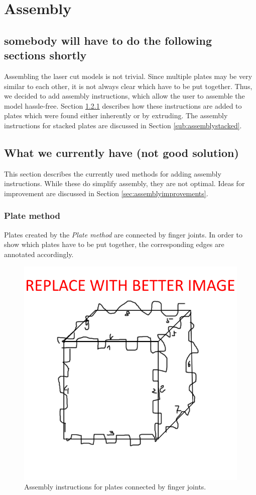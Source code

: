 \documentclass[../ClassicThesis.tex]{subfiles}
\begin{document}
\chapter{Assembly}\label{ch:assembly}
\section{somebody will have to do the following sections shortly}

Assembling the laser cut models is not trivial. Since multiple plates may be very similar to each other, it is not always clear which have to be put together. Thus, we decided to add assembly instructions, which allow the user to assemble the model hassle-free. Section \ref{sub:assemblyplates} describes how these instructions are added to plates which were found either inherently or by extruding. The assembly instructions for stacked plates are discussed in Section \ref{sub:assemblystacked}.

\section{What we currently have (not good solution)}

This section describes the currently used methods for adding assembly instructions. While these do simplify assembly, they are not optimal. Ideas for improvement are discussed in Section \ref{sec:assemblyimprovements}.

\subsection{Plate method}\label{sub:assemblyplates}

Plates created by the \emph{Plate method} \fabmethod are connected by finger joints. In order to show which plates have to be put together, the corresponding edges are annotated accordingly.

\begin{figure}
    \centering
    \includegraphics[width=0.5\columnwidth]{Images/assembly_plates.png}
    \caption{Assembly instructions for plates connected by finger joints.}
    \label{fig:assemblyplates}
\end{figure}
\end{document}
